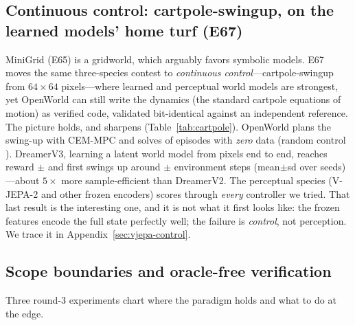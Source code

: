\documentclass[11pt]{article}
\begin{document}
\subsection{Continuous control: cartpole-swingup, on the learned models' home turf (E67)}\label{sec:cartpole}
MiniGrid (E65) is a gridworld, which arguably favors symbolic models. E67 moves the same
three-species contest to \emph{continuous control}---cartpole-swingup from $64\times64$
pixels---where learned and perceptual world models are strongest, yet OpenWorld can still
write the dynamics (the standard cartpole equations of motion) as verified code, validated
bit-identical against an independent reference. The picture holds, and sharpens
(Table~\ref{tab:cartpole}). OpenWorld plans the swing-up with CEM-MPC and solves
\CartOpenWorldSolve{} of episodes with \emph{zero} data (random control \CartRandomSolve).
DreamerV3, learning a latent world model from pixels end to end, reaches reward
\CartDreamerReward{}$\pm$\CartDreamerRewardSD{} and first swings up around
\CartDreamerSteps{}$\pm$\CartDreamerStepsSD{} environment steps (mean$\pm$sd over
\CartDreamerSeeds{} seeds)---about $5\times$ more sample-efficient than DreamerV2. The perceptual species (V-JEPA-2 and other
frozen encoders) scores \CartVjepaSolve{} through \emph{every} controller we tried. That
last result is the interesting one, and it is not what it first looks like: the frozen
features encode the full state perfectly well; the failure is \emph{control}, not
perception. We trace it in Appendix~\ref{sec:vjepa-control}.

\begin{table}[htb]\centering\small

\caption{\textbf{Cartpole-swingup head-to-head (E67).} Verified-code vs.\ end-to-end
learned vs.\ frozen-perceptual world models on continuous control from pixels. OpenWorld's
ODE is validated bit-identical to an independent reference; DreamerV3/V2 trained on a
dedicated A100. Learned models report converged reward + sample efficiency; OpenWorld and
the frozen-perceptual models report a swing-up solve rate.}
\label{tab:cartpole}
\end{table}

\subsection{Scope boundaries and oracle-free verification}\label{sec:boundaries}
Three round-3 experiments chart where the paradigm holds and what to do at
the edge.
\end{document}
